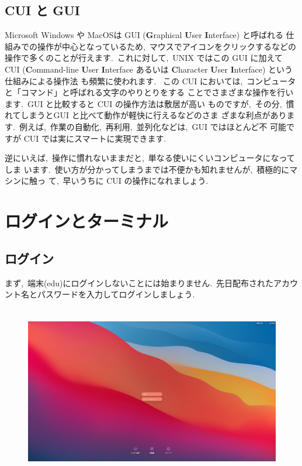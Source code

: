 \documentclass{jarticle}
\begin{document}
 \subsection{CUI と GUI}
 Microsoft Windows や MacOSは GUI (\textbf{G}raphical \textbf{U}ser \textbf{I}nterface) と呼ばれる
 仕組みでの操作が中心となっているため,\ マウスでアイコンをクリックするなどの操作で多くのことが行えます.\ 
 これに対して,\ UNIX ではこの GUI に加えて CUI
 (\textbf{C}ommand-line \textbf{U}ser \textbf{I}nterface あるいは
 \textbf{C}haracter \textbf{U}ser \textbf{I}nterface) という仕組みによる操作法
 も頻繁に使われます.\ 
 この CUI においては,\ コンピュータと「コマンド」と呼ばれる文字のやりとりをする
 ことでさまざまな操作を行います.\ GUI と比較すると CUI の操作方法は敷居が高い
 ものですが,\ その分,\ 慣れてしまうとGUI と比べて動作が軽快に行えるなどのさま
 ざまな利点があります.\ 例えば,\ 作業の自動化,\ 再利用,\ 並列化などは,\ GUI ではほとんど不
 可能ですが CUI では実にスマートに実現できます.\ 

 逆にいえば,\ 操作に慣れないままだと,\ 単なる使いにくいコンピュータになってしま
 います.\ 使い方が分かってしまうまでは不便かも知れませんが,\ 積極的にマシンに触っ
 て,\ 早いうちに CUI の操作になれましょう.\ 


\section{ログインとターミナル}
 \subsection{ログイン}
まず,\ 端末(edu)にログインしないことには始まりません.\ 
先日配布されたアカウント名とパスワードを入力してログインしましょう.\ 

\begin{figure}[H]
  \centering
  \includegraphics[height=7.5cm]{fig/MacLogin.png}
\end{figure}
\end{document}
